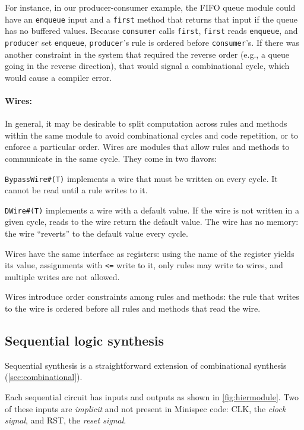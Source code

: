 For instance, in our producer-consumer example, the FIFO queue module could have an
\texttt{enqueue} input and a \texttt{first} method that returns that input if the queue has no buffered values.
Because \texttt{consumer} calls \texttt{first}, \texttt{first} reads \texttt{enqueue}, and \texttt{producer}
set \texttt{enqueue}, \texttt{producer}'s rule is ordered before \texttt{consumer}'s.
If there was another constraint in the system that required the reverse order
(e.g., a queue going in the reverse direction), that would signal a combinational cycle,
which would cause a compiler error.

\paragraph{Wires:}
In general, it may be desirable to split computation across rules and methods
within the same module to avoid combinational cycles and code repetition, or to enforce a particular order.
Wires are modules that allow rules and methods to communicate in the same cycle.
They come in two flavors:
\begin{compactitem}
\item \verb|BypassWire#(T)| implements a wire that must be written on every cycle. It cannot be read until a rule writes to it.
\item \verb|DWire#(T)| implements a wire with a default value. If the wire is not written in a given cycle,
  reads to the wire return the default value. The wire has no memory: the wire ``reverts'' to the default value every cycle.
\end{compactitem}
Wires have the same interface as registers: using the name of the register yields its value,
assignments with \verb|<=| write to it, only rules may write to wires, and multiple writes are not allowed.

Wires introduce order constraints among rules and methods:
the rule that writes to the wire is ordered before all rules and methods that read the wire.

\subsection{Sequential logic synthesis}
\label{sec:sequential}

Sequential synthesis is a straightforward extension of combinational synthesis (\autoref{sec:combinational}).

Each sequential circuit has inputs and outputs as shown in \autoref{fig:hiermodule}.
Two of these inputs are \emph{implicit} and not present in Minispec code:
CLK, the \emph{clock signal}, and RST, the \emph{reset signal}.

